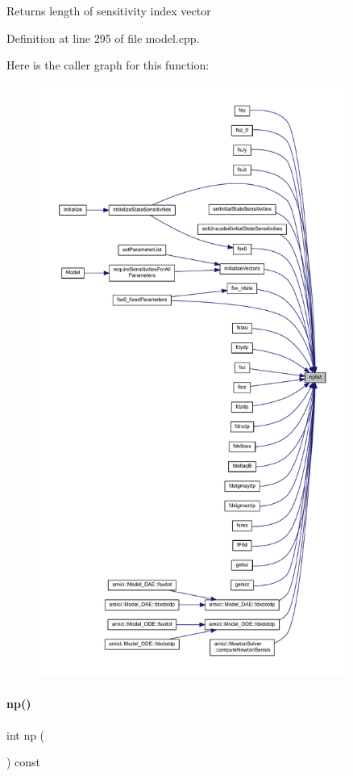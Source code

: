 \begin{DoxyReturn}{Returns}
length of sensitivity index vector 
\end{DoxyReturn}


Definition at line 295 of file model.\+cpp.

Here is the caller graph for this function\+:
\nopagebreak
\begin{figure}[H]
\begin{center}
\leavevmode
\includegraphics[height=550pt]{classamici_1_1_model_a0f8e994055e37954d7746f3c1af27a5c_icgraph}
\end{center}
\end{figure}
\mbox{\label{classamici_1_1_model_ae296546c9fd4d7c4ad3b7000aa9e22ef}} 
\paragraph{\texorpdfstring{np()}{np()}}
{\footnotesize\ttfamily int np (\begin{DoxyParamCaption}{ }\end{DoxyParamCaption}) const}

